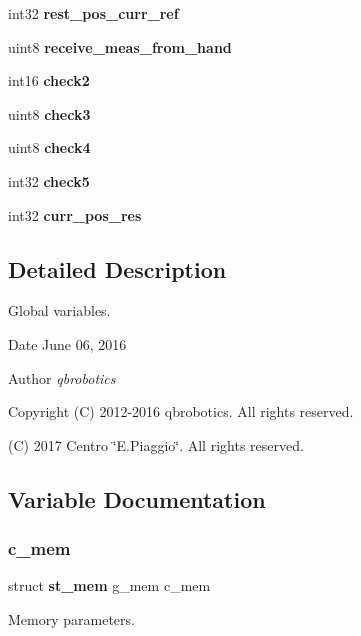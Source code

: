 \begin{DoxyCompactItemize}
int32 {\bfseries rest\+\_\+pos\+\_\+curr\+\_\+ref}
\item 
\mbox{\label{globals_8c_a50b50a565306d9a28c9e86694428a759}} 
uint8 {\bfseries receive\+\_\+meas\+\_\+from\+\_\+hand}
\item 
\mbox{\label{globals_8c_ab43d57397f71cb35c19d91058c48bed2}} 
int16 {\bfseries check2}
\item 
\mbox{\label{globals_8c_a07ae6981551bcb1232593903a0cec1be}} 
uint8 {\bfseries check3}
\item 
\mbox{\label{globals_8c_a57815d5e67537f44e37f31deb0cca84e}} 
uint8 {\bfseries check4}
\item 
\mbox{\label{globals_8c_a3e70f7fe645db3f664a6a47e63af6bff}} 
int32 {\bfseries check5}
\item 
\mbox{\label{globals_8c_ab2b7ed40fdef23f9dad3b7351df3b8f4}} 
int32 {\bfseries curr\+\_\+pos\+\_\+res}
\end{DoxyCompactItemize}


\subsection{Detailed Description}
Global variables. 

\begin{DoxyDate}{Date}
June 06, 2016 
\end{DoxyDate}
\begin{DoxyAuthor}{Author}
{\itshape qbrobotics} 
\end{DoxyAuthor}
\begin{DoxyCopyright}{Copyright}
(C) 2012-\/2016 qbrobotics. All rights reserved. 

(C) 2017 Centro \char`\"{}\+E.\+Piaggio\char`\"{}. All rights reserved. 
\end{DoxyCopyright}


\subsection{Variable Documentation}
\mbox{\label{globals_8c_a44c3cbd8e234e0816f0334e29646a800}} 
\subsubsection{c\+\_\+mem}
{\footnotesize\ttfamily struct \textbf{ st\+\_\+mem} g\+\_\+mem c\+\_\+mem}

Memory parameters. \mbox{\label{globals_8c_a21f4f67e4203dea0b9956589eaa6cef3}} 
